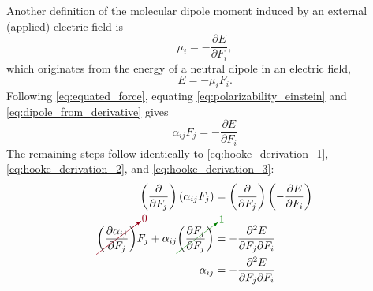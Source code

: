 \documentclass[%
class = book,%
crop = false,%
float = true,%
multi = true,%
preview = false,%
]{standalone}
\begin{document}
Another definition of the molecular dipole moment induced by an external (applied) electric field is
\begin{equation}
  \label{eq:dipole_from_derivative}
  \mu_{i} = -\frac{\partial E}{\partial F_{i}},
\end{equation}
which originates from the energy of a neutral dipole in an electric field,
\begin{equation}
  \label{eq:dipole_energy}
  E = - \mu_{i} F_{i}.
\end{equation}
Following \eqref{eq:equated_force}, equating \eqref{eq:polarizability_einstein} and \eqref{eq:dipole_from_derivative} gives
\begin{equation}
  \label{eq:equated_polarizability}
  \alpha_{ij} F_{j} = -\frac{\partial E}{\partial F_{i}}
\end{equation}
The remaining steps follow identically to \eqref{eq:hooke_derivation_1}, \eqref{eq:hooke_derivation_2}, and \eqref{eq:hooke_derivation_3}:
\begin{align}
  \left( \frac{\partial}{\partial F_{j}} \right) \left( \alpha_{ij} F_{j} \right) &= \left( \frac{\partial}{\partial F_{j}} \right) \left( -\frac{\partial E}{\partial F_{i}} \right) \\
  \Ccancelto[carmine]{0}{\left( \frac{\partial \alpha_{ij}}{\partial F_{j}} \right)} F_{j} + \alpha_{ij} \Ccancelto[Green]{1}{\left( \frac{\partial F_{j}}{\partial F_{j}} \right)} &= -\frac{\partial^{2} E}{\partial F_{j} \partial F_{i}} \\
  \label{eq:polarizability-derivative-definition}
  \alpha_{ij} &= -\frac{\partial^{2} E}{\partial F_{j} \partial F_{i}}
\end{align}

\subsection{\texorpdfstring{\href{https://chemistry.stackexchange.com/q/74683/194}{\color{black}{Series expansion}}}{Series expansion}}
\label{ssec:series-expansion}
\end{document}
